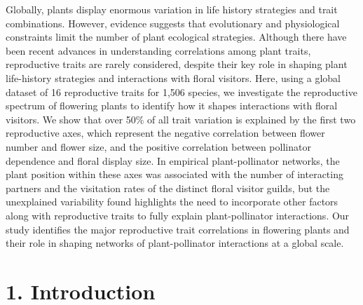 \documentclass[
  12pt,
  a4paper,
]{article}
\begin{document}
Globally, plants display enormous variation in life history strategies and trait combinations. However, evidence suggests that evolutionary and physiological constraints limit the number of plant ecological strategies. Although there have been recent advances in understanding correlations among plant traits, reproductive traits are rarely considered, despite their key role in shaping plant life-history strategies and interactions with floral visitors. Here, using a global dataset of 16 reproductive traits for 1,506 species, we investigate the reproductive spectrum of flowering plants to identify how it shapes interactions with floral visitors. We show that over 50\% of all trait variation is explained by the first two reproductive axes, which represent the negative correlation between flower number and flower size, and the positive correlation between pollinator dependence and floral display size. In empirical plant-pollinator networks, the plant position within these axes was associated with the number of interacting partners and the visitation rates of the distinct floral visitor guilds, but the unexplained variability found highlights the need to incorporate other factors along with reproductive traits to fully explain plant-pollinator interactions. Our study identifies the major reproductive trait correlations in flowering plants and their role in shaping networks of plant-pollinator interactions at a global scale.

\doublespacing
\vspace{5mm}
\normalsize

\hypertarget{introduction}{%
\section{1. Introduction}\label{introduction}}
\end{document}
